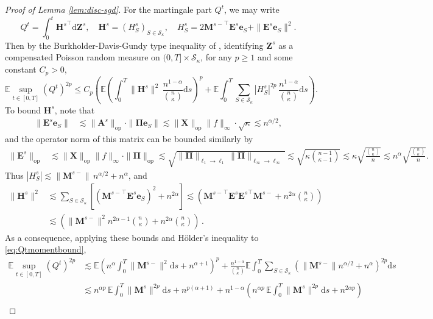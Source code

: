 \documentclass[11pt,letterpaper,reqno]{amsart}
\theoremstyle{definition}
\def\d{\mathrm{d}}
\def\E{\mathbb{E}}
\def\op{\mathrm{op}}
\def\e{\mathbf{e}}
\def\A{\mathbf{A}}
\def\bE{\mathbf{E}}
\def\H{\mathbf{H}}
\def\M{\mathbf{M}}
\def\X{\mathbf{X}}
\def\bZ{\mathbf{Z}}
\def\bPi{\boldsymbol{\Pi}}
\def\set{\mathscr{S}_\kappa}
\newcommand{\norm}[1]{\|#1\|}
\newcommand{\normop}[1]{\|#1\|_{\mathrm{op}}}
\newcommand{\prn}[1]{\left({#1}\right)} %
\newcommand{\brk}[1]{\left[{#1}\right]} %
\begin{document}
\begin{proof}[Proof of Lemma \ref{lem:disc-sgd}]
For the martingale part $Q^t$, we may write
\[Q^t=\int_0^t {\H^s}^\top \d\bZ^s,
\quad \H^s=(H_S^s)_{S \in \set},
\quad H_S^s=2{\M^{s-}}^\top \bE^s\e_S+\|\bE^s\e_S\|^2.\]
Then by the Burkholder-Davis-Gundy type inequality of
\cite[Theorem 2.11]{kunita2004stochastic}, 
identifying $\bZ^s$ as a compensated Poisson random measure on $(0,T] \times
\set$, for any $p \geq 1$ and some constant $C_p>0$,
\begin{equation}\label{eq:Qtmomentbound}
\E \sup_{t \in [0,T]} (Q^t)^{2p}
\leq C_p\left(\E\left(\int_0^T \|\H^s\|^2\,
\frac{n^{1-\alpha}}{\binom{n}{\kappa}}\d s\right)^p
+\E\int_0^T \sum_{S \in \set} |H_S^s|^{2p}\,
\frac{n^{1-\alpha}}{\binom{n}{\kappa}}\d s\right).
\end{equation}
To bound $\H^s$, note that
\begin{align*}
\norm{\bE^s\e_S} &\lesssim \|\A^s\|_\op \cdot \|\bPi\e_S\|
\lesssim \normop{\X}\norm{f}_\infty \cdot \sqrt{\kappa}  \lesssim n^{\alpha/2},
\end{align*}
and the operator norm of this matrix can be bounded similarly by 
\begin{align*}
    \norm{\bE^s}_\op &\lesssim \normop{\X}\norm{f}_\infty \cdot \norm{\bPi}_\op \lesssim
\sqrt{\|\bPi\|_{\ell_1 \to \ell_1} \|\bPi\|_{\ell_\infty \to \ell_\infty}}
\lesssim \sqrt{\kappa \binom{n-1}{\kappa-1}}
\lesssim
{\kappa}\sqrt{\frac{{n\choose \kappa}}{n}} \lesssim
n^{\alpha}\sqrt{\frac{{n\choose \kappa}}{n}}.
\end{align*}
Thus $|H_S^s| \lesssim \norm{\M^{s-}}\,n^{\alpha/2} + n^{\alpha}$, and
\begin{align*}
\|\H^s\|^2 &\lesssim \sum_{S \in \set} \brk{\prn{{\M^{s-}}^\top \bE^s \e_S}^2
+ n^{2\alpha}} \lesssim \prn{{\M^{s-}}^\top \bE^s{\bE^s}^\top \M^{s-}
+ n^{2\alpha}{n\choose \kappa}}\\
&\lesssim \prn{\norm{\M^{s-}}^2 n^{2\alpha-1}{n\choose \kappa} + n^{2\alpha}{n\choose \kappa}}\,.
\end{align*}
As a consequence, applying these bounds and H\"older's inequality to
\eqref{eq:Qtmomentbound},
\begin{align}
    \E\sup_{t\in[0,T]} (Q^t)^{2p}
    &\lesssim \E\prn{n^{\alpha}\int_0^T \norm{\M^{s-}}^2 \d s +
n^{\alpha+1}}^{p} + \frac{n^{1-\alpha}}{{n\choose\kappa}}\E\int_0^T \sum_{S \in
\set} \prn{\norm{\M^{s-}}n^{\alpha /2} + n^{\alpha }}^{2p} \d s\nonumber\\
    &\lesssim n^{\alpha p}\,\E\int_0^T \norm{\M^s}^{2p} \d s +
n^{p(\alpha+1)} + n^{1-\alpha}\left(n^{\alpha p}\,\E \int_0^T
\norm{\M^s}^{2p} \d s+n^{2\alpha p}\right)\nonumber\\

\end{align}
\end{proof}
\end{document}
